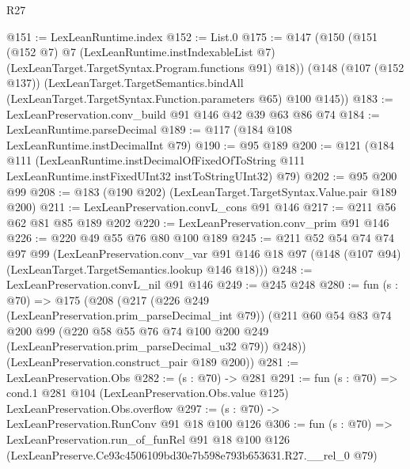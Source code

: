 \begin{lexlean}{R27}
\begin{coremodule}
@151 := LexLeanRuntime.index
@152 := List.{0}
@175 := @147
    (@150
      (@151
        (@152 @7)
        @7
        (LexLeanRuntime.instIndexableList @7)
        (LexLeanTarget.TargetSyntax.Program.functions @91)
        @18))
    (@148
      (@107 (@152 @137))
      (LexLeanTarget.TargetSemantics.bindAll
        (LexLeanTarget.TargetSyntax.Function.parameters @65)
        @100
        @145))
@183 := LexLeanPreservation.conv_build @91 @146 @42 @39 @63 @86 @74
@184 := LexLeanRuntime.parseDecimal
@189 := @117 (@184 @108 LexLeanRuntime.instDecimalInt @79)
@190 := @95 @189
@200 := @121
    (@184
      @111
      (LexLeanRuntime.instDecimalOfFixedOfToString
        @111
        LexLeanRuntime.instFixedUInt32
        instToStringUInt32)
      @79)
@202 := @95 @200 @99
@208 := @183 (@190 @202) (LexLeanTarget.TargetSyntax.Value.pair @189 @200)
@211 := LexLeanPreservation.convL_cons @91 @146
@217 := @211 @56 @62 @81 @85 @189 @202
@220 := LexLeanPreservation.conv_prim @91 @146
@226 := @220 @49 @55 @76 @80 @100 @189
@245 := @211
    @52
    @54
    @74
    @74
    @97
    @99
    (LexLeanPreservation.conv_var
      @91
      @146
      @18
      @97
      (@148 (@107 @94) (LexLeanTarget.TargetSemantics.lookup @146 @18)))
@248 := LexLeanPreservation.convL_nil @91 @146
@249 := @245 @248
@280 := fun (s : @70) =>
  @175
    (@208
      (@217
        (@226 @249 (LexLeanPreservation.prim_parseDecimal_int @79))
        (@211
          @60
          @54
          @83
          @74
          @200
          @99
          (@220 @58 @55 @76 @74 @100 @200 @249 (LexLeanPreservation.prim_parseDecimal_u32 @79))
          @248))
      (LexLeanPreservation.construct_pair @189 @200))
@281 := LexLeanPreservation.Obs
@282 := (s : @70) -> @281
@291 := fun (s : @70) =>
  cond.{1} @281 @104 (LexLeanPreservation.Obs.value @125) LexLeanPreservation.Obs.overflow
@297 := (s : @70) -> LexLeanPreservation.RunConv @91 @18 @100 @126
@306 := fun (s : @70) =>
  LexLeanPreservation.run_of_funRel
    @91
    @18
    @100
    @126
    (LexLeanPreserve.Ce93c4506109bd30e7b598e793b653631.R27.__rel_0 @79)
\end{coremodule}
\end{lexlean}
